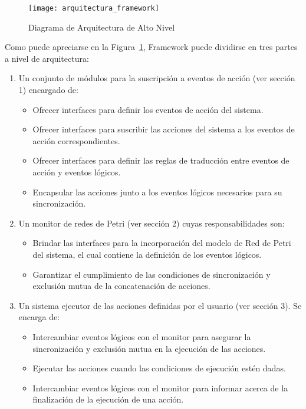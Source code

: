 \begin{figure}[H]
	\centering
	\texttt{[image: arquitectura\_framework]}
	\caption{Diagrama de Arquitectura de Alto Nivel}
	\label{fig:arquitectura_petri-manejador-acciones-mundo}
\end{figure}

Como puede apreciarse en la
Figura~\ref{fig:arquitectura_petri-manejador-acciones-mundo}, \nombreFramework
Framework puede dividirse en tres partes a nivel de arquitectura:
\begin{enumerate}
  \item Un conjunto de módulos para la suscripción a eventos de acción (ver
  sección 1) encargado de:
  \begin{itemize}
    \item Ofrecer interfaces para definir los eventos de acción del sistema.
    \item Ofrecer interfaces para suscribir las acciones del sistema a los
    eventos de acción correspondientes.
    \item Ofrecer interfaces para definir las reglas de traducción entre eventos
    de acción y eventos lógicos.
    \item Encapsular las acciones junto a los eventos lógicos necesarios para su
    sincronización.
  \end{itemize}
\item Un monitor de redes de Petri (ver sección 2) cuyas responsabilidades son:
	\begin{itemize}
	  \item Brindar las interfaces para la incorporación del modelo de Red de Petri
	  del sistema, el cual contiene la definición de los eventos
	  lógicos.
	  \item Garantizar el cumplimiento de las condiciones de sincronización y
	  exclusión mutua de la concatenación de acciones.
	\end{itemize}
\item Un sistema ejecutor de las acciones definidas por el usuario (ver sección 3). 
  Se encarga de:
  \begin{itemize}
	  \item Intercambiar eventos lógicos con el monitor para asegurar la
	  sincronización y exclusión mutua en la ejecución de las acciones.
	  \item Ejecutar las acciones cuando las condiciones de ejecución
	  estén dadas.
	  \item Intercambiar eventos lógicos con el monitor para informar acerca de la
	  finalización de la ejecución de una acción.
	\end{itemize}
\end{enumerate}

